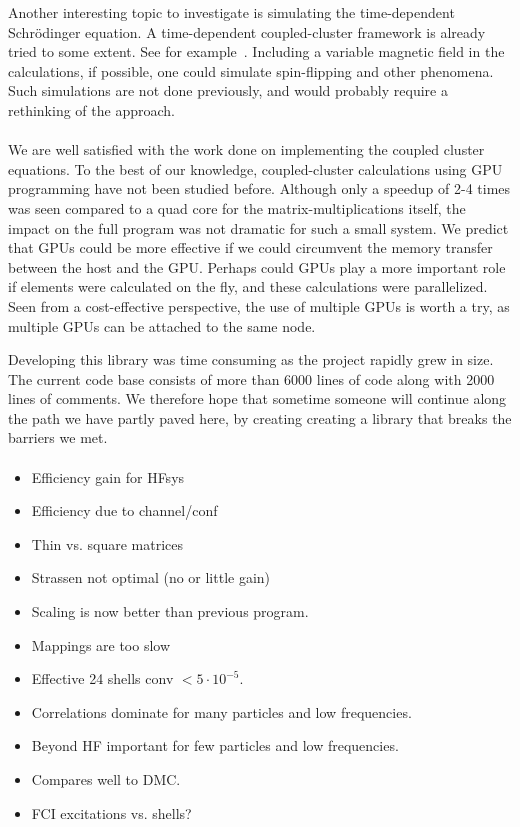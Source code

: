 Another interesting topic to investigate is simulating the time-dependent Schrödinger equation.
A time-dependent coupled-cluster framework is already tried to some extent.
See for example~\cite{kvaal:194109}.
Including a variable magnetic field in the calculations, if possible, one could simulate spin-flipping and other phenomena.
Such simulations are not done previously, and would probably require a rethinking of the approach.


\paragraph{}
We are well satisfied with the work done on implementing the coupled cluster equations.
To the best of our knowledge, coupled-cluster calculations using GPU programming have not been studied before.
Although only a speedup of 2-4 times was seen compared to a quad core for the matrix-multiplications itself, the impact on the full program was not dramatic for such a small system.
We predict that GPUs could be more effective if we could circumvent the memory transfer between the host and the GPU.
Perhaps could GPUs play a more important role if elements were calculated on the fly, and these calculations were parallelized.
Seen from a cost-effective perspective, the use of multiple GPUs is worth a try, as multiple GPUs can be attached to the same node.

Developing this library was time consuming as the project rapidly grew in size.
The current code base consists of more than 6000 lines of code along with 2000 lines of comments.
We therefore hope that sometime someone will continue along the path we have partly paved here, by creating creating a library that breaks the barriers we met.


\paragraph{}
\begin{itemize}
\item Efficiency gain for HFsys
\item Efficiency due to channel/conf
\item Thin vs. square matrices
\item Strassen not optimal (no or little gain)
\item Scaling is now better than previous program.
\item Mappings are too slow
\item Effective 24 shells conv $< 5\cdot 10^{-5}$.
\item Correlations dominate for many particles and low frequencies.
\item Beyond HF important for few particles and low frequencies.
\item Compares well to DMC.
\item FCI excitations vs. shells?
\end{itemize}


